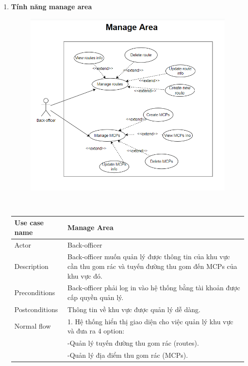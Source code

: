 \documentclass[a4paper]{article}
\begin{document}
\begin{enumerate}
    \item \textbf{Tính năng manage area}
\\
\begin{figure}[!h]
    \begin{center}
      \includegraphics[width=6in]{Image/manageArea_diagram.png}
    \end{center}
\end{figure}
\\
\begin{tabular}{|p{3cm} | p{10cm}|} 
\hline
     Use case name & \textbf{Manage Area}  \\
     \hline
     Actor & Back-officer \\
     \hline
     Description & Back-officer muốn quản lý được thông tin của khu vực cần thu gom rác và tuyến đường thu gom đến MCPs của khu vực đó. \\
     \hline
     Preconditions & Back-officer phải log in vào hệ thống bằng tài khoản được cấp quyền quản lý.\\
     \hline
     Postconditions & Thông tin về khu vực được quản lý dễ dàng. \\
     \hline
     Normal flow & 
     1. Hệ thống hiển thị giao diện cho việc quản lý khu vực và đưa ra 4 option: \\
        & \hspace{1cm} -Quản lý tuyến đường thu gom rác (routes).\\
        & \hspace{1cm} -Quản lý địa điểm thu gom rác (MCPs). \\

\end{tabular}
\end{enumerate}
\end{document}
